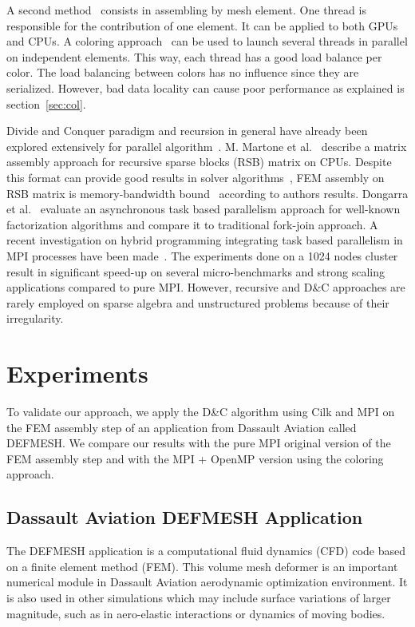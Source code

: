 \documentclass[10pt]{IOS-Book-Article}
\begin{document}
A second method~\cite{cecka2011assembly} consists in assembling by mesh element. One thread is responsible for the contribution of one element.
It can be applied to both GPUs and CPUs.
A coloring approach~\cite{CUDAfe,CPUfe} can be used to launch several threads in parallel on independent elements.
This way, each thread has a good load balance per color. The load balancing between colors has no influence since they are serialized.
However, bad data locality can cause poor performance as explained is section~\ref{sec:col}.

Divide and Conquer paradigm and recursion in general have already been explored extensively for parallel algorithm~\cite{div}.
M. Martone et al.~\cite{RSBasm} describe a matrix assembly approach for recursive sparse blocks (RSB) matrix on CPUs.
Despite this format can provide good results in solver algorithms~\cite{RSBsolver}, FEM assembly on RSB matrix is memory-bandwidth bound~\cite{RSBasm} according to authors results.
Dongarra et al.~\cite{Dongarra} evaluate an asynchronous task based parallelism approach for well-known factorization algorithms and compare it to traditional fork-join approach.
A recent investigation on hybrid programming integrating task based parallelism in MPI processes have been made~\cite{MPI_task}.
The experiments done on a 1024 nodes cluster result in significant speed-up on several micro-benchmarks and strong scaling applications compared to pure MPI.
However, recursive and D\&C approaches are rarely employed on sparse algebra and unstructured problems because of their irregularity.

\section{Experiments}
To validate our approach, we apply the D\&C algorithm using Cilk and MPI on the FEM assembly step of an application from Dassault Aviation called DEFMESH.
We compare our results with the pure MPI original version of the FEM assembly step and with the MPI + OpenMP version using the coloring approach.

\subsection{Dassault Aviation DEFMESH Application}
The DEFMESH application is a computational fluid dynamics (CFD) code based on a finite element method (FEM).
This volume mesh deformer is an important numerical module in Dassault Aviation aerodynamic optimization environment.
It is also used in other simulations which may include surface variations of larger magnitude, such as in aero-elastic interactions or dynamics of moving bodies.
\end{document}
